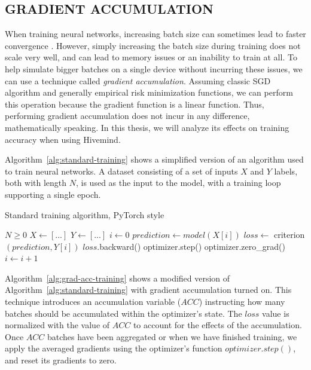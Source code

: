 \subsection{GRADIENT ACCUMULATION}\label{sec:gradient-accumulation}

When training neural networks, increasing batch size can sometimes lead to faster convergence \cite{Krizhevsky2014owt, goyal2017accurate, you2017scaling}.
However, simply increasing the batch size during training does not scale very well, and can lead to memory issues or an inability to train at all.
To help simulate bigger batches on a single device without incurring these issues, we can use a technique called \textit{gradient accumulation}.
Assuming classic SGD algorithm and generally empirical risk minimization functions, we can perform this operation because the gradient function is a linear function.
Thus, performing gradient accumulation does not incur in any difference, mathematically speaking.
In this thesis, we will analyze its effects on training accuracy when using Hivemind.

Algorithm~\ref{alg:standard-training} shows a simplified version of an algorithm used to train neural networks.
A dataset consisting of a set of inputs $X$ and $Y$ labels, both with length $N$, is used as the input to the model, with a training loop supporting a single epoch.


\begin{algorithm}
    \caption{Standard training algorithm, PyTorch style}\label{alg:standard-training}
    \begin{algorithmic}
        \Require $N \geq 0$
        \State $X \gets [...]$ 
        \State $Y \gets [...]$ 
        \State $i \gets 0$
        \State $prediction \gets model(X[i])$
        \State $loss \gets $ criterion$(prediction, Y[i])$
        \State $loss$.backward()
        \State optimizer.step()
        \State optimizer.zero\_grad()
        \State $i \gets i + 1$
        \EndWhile
    \end{algorithmic}
\end{algorithm}

Algorithm~\ref{alg:grad-acc-training} shows a modified version of Algorithm~\ref{alg:standard-training} with gradient accumulation turned on.
This technique introduces an accumulation variable ($ACC$) instructing how many batches should be accumulated within the optimizer's state.
The $loss$ value is normalized with the value of $ACC$ to account for the effects of the accumulation.
Once $ACC$ batches have been aggregated or when we have finished training, we apply the averaged gradients using the optimizer's function $optimizer.step()$, and reset its gradients to zero.

